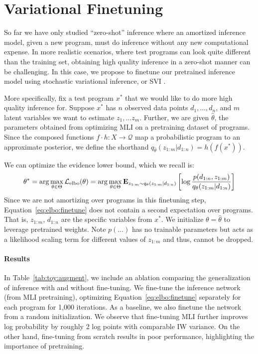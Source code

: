 \section{Variational Finetuning}
\label{sec:finetune}

So far we have only studied ``zero-shot'' inference where an amortized inference model, given a new program, must do inference without any new computational expense. In more realistic scenarios, where test programs can look quite different than the training set, obtaining high quality inference in a zero-shot manner can be challenging. In this case, we propose to finetune our pretrained inference model using stochastic variational inference, or SVI \cite{hoffman2013stochastic,ranganath2014black,kucukelbir2017automatic}.

More specifically, fix a test program $x^*$ that we would like to do more high quality inference for. Suppose $x^*$ has $n$ observed data points $d_1, \ldots, d_n$, and $m$ latent variables we want to estimate $z_1, \ldots z_m$. Further, we are given $\hat{\theta}$, the parameters obtained from optimizing MLI on a pretraining dataset of programs. Since the composed functions $f \cdot h: X \rightarrow \mathcal{Q}$ map a probabilistic program to an approximate posterior, we define the shorthand $q_{\hat{\theta}}(z_{1:m}|d_{1:n}) = h(f(x^*))$.

We can optimize the evidence lower bound, which we recall is:
\begin{equation}
  \theta^* = \arg\max_{\theta \in \Theta} \mathcal{L}_{\textup{elbo}}(\theta) = \arg\max_{\theta \in \Theta} \mathbf{E}_{z_{1:m} \sim q_{\theta}(z_{1:m}|d_{1:n})} \left[\log \frac{p(d_{1:n}, z_{1:m})}{q_\theta(z_{1:m}|d_{1:n})}\right]
  \label{eq:elbo:finetune}
\end{equation}
Since we are not amortizing over programs in this finetuning step, Equation~\ref{eq:elbo:finetune} does not contain a second expectation over programs. That is, $z_{1:m}$, $d_{1:n}$ are the specific variables from $x^*$.
We initialize $\theta = \hat{\theta}$ to leverage pretrained weights. Note $p(\ldots)$ has no trainable parameters but acts as a likelihood scaling term for different values of $z_{1:m}$ and thus, cannot be dropped.

\paragraph{Results} In Table~\ref{tab:toy:augment}, we include an ablation  comparing the generalization of inference with and without fine-tuning. We fine-tune the inference network (from MLI pretraining), optimizing Equation~\ref{eq:elbo:finetune} separately for each program for 1,000 iterations. As a baseline, we also finetune the network from a random initialization. We observe that fine-tuning MLI further improves log probability by roughly 2 log points with comparable IW variance. On the other hand, fine-tuning from scratch results in poor performance, highlighting the importance of pretraining.

